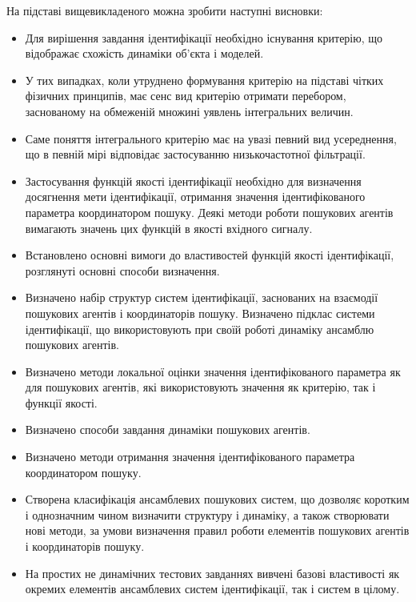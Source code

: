 На підставі вищевикладеного можна зробити наступні висновки:

\begin{itemize}

  \item
    Для вирішення завдання ідентифікації необхідно існування
    критерію, що відображає схожість динаміки об'єкта і моделей.

  \item
    У тих випадках, коли утруднено формування критерію на
    підставі чітких фізичних принципів, має сенс вид критерію
    отримати перебором, заснованому на обмеженій множині уявлень
    інтегральних величин.

  \item
    Саме поняття інтегрального критерію має на увазі певний
    вид усереднення, що в певній мірі відповідає застосуванню
    низькочастотної фільтрації.

  \item
    Застосування функцій якості ідентифікації необхідно для
    визначення досягнення мети ідентифікації, отримання значення
    ідентифікованого параметра координатором пошуку. Деякі методи
    роботи пошукових агентів вимагають значень цих функцій в якості
    вхідного сигналу.

  \item
    Встановлено основні вимоги до властивостей функцій якості
    ідентифікації, розглянуті основні способи визначення.

  \item
    Визначено набір структур систем ідентифікації, заснованих на
    взаємодії пошукових агентів і координаторів пошуку. Визначено
    підклас системи ідентифікації, що використовують при своїй
    роботі динаміку ансамблю пошукових агентів.

  \item
    Визначено методи локальної оцінки значення ідентифікованого
    параметра як для пошукових агентів, які використовують значення
    як критерію, так і функції якості.

  \item
    Визначено способи завдання динаміки пошукових агентів.

  \item
    Визначено методи отримання значення ідентифікованого параметра
    координатором пошуку.

  \item
    Створена класифікація ансамблевих пошукових систем, що дозволяє
    коротким і однозначним чином визначити структуру і динаміку,
    а також створювати нові методи, за умови визначення правил
    роботи елементів пошукових агентів і координаторів пошуку.

  \item
    На простих не динамічних тестових завданнях вивчені базові
    властивості як окремих елементів ансамблевих систем
    ідентифікації, так і систем в цілому.


\end{itemize}

